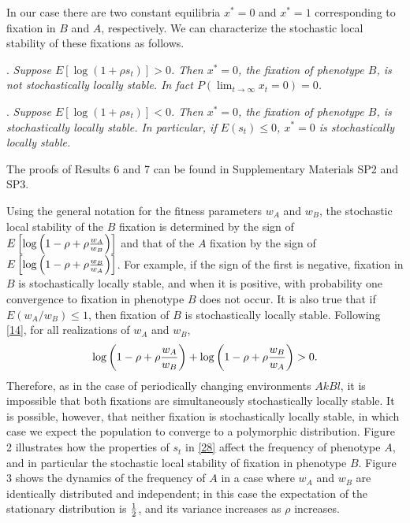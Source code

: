 \documentclass[9pt,twocolumn,twoside,lineno]{pnas-new}
\begin{document}
 In our case there are two constant equilibria $x^*=0$ and $x^*=1$ corresponding to fixation in $B$ and $A$, respectively. We can characterize the stochastic local stability of these fixations as follows.
 \medskip
 
 . {\sl Suppose $E\left[\log (1+\rho s_t)\right]>0$. Then $x^*=0$, the fixation of phenotype $B$, is not stochastically locally stable. In fact $P\left(\lim_{t\to\infty}x_t=0\right)=0$.}
 \medskip
 
  . {\sl Suppose $E[\log(1+\rho s_t)]<0$. Then $x^*=0$, the fixation of phenotype $B$, is stochastically locally stable. In particular, if $E(s_t)\le 0$, $x^*=0$ is stochastically locally stable.}
\smallskip
 
 The proofs of Results 6 and  7 can be found in Supplementary Materials SP2 and SP3.
 
 
 Using the general notation for the fitness parameters $w_A$ and $w_B$, the stochastic local stability of the $B$ fixation is determined by the sign of $E\left[\log\left(1-\rho+\rho{w_A\over w_B}\right)\right]$ and that of the $A$ fixation by the sign of $E\left[\log\left(1-\rho+\rho{w_B\over w_A}\right)\right]$. For example, if the  sign of the first  is negative, fixation in $B$ is stochastically locally stable, and when it is positive, with probability one convergence to fixation in phenotype $B$ does not occur. It is also true  that if $E(w_A/w_B)\le 1$, then fixation of $B$ is stochastically locally stable. Following \eqref{14}, for all realizations of $w_A$ and $w_B$,
 \begin{equation}
 \log\left(1-\rho +\rho{w_A\over w_B}\right) +\log\left(1-\rho +\rho{w_B\over w_A}\right)>0.\label{30}\end{equation}
 Therefore, as in the case of periodically changing environments $AkBl$, it is impossible that both fixations are simultaneously stochastically locally stable.  It is possible, however, that neither fixation is  stochastically locally stable, in which case we expect the population to converge to a polymorphic distribution. Figure 2 illustrates how the properties of $s_t$ in \eqref{28} affect the frequency of phenotype $A$, and in particular the stochastic local stability of fixation in phenotype $B$. Figure 3 shows the dynamics of the frequency of $A$ in a case where $w_A$ and $w_B$ are identically distributed and independent; in this case the expectation of the stationary distribution is ${1\over 2}$, and its variance increases as $\rho$ increases.
\end{document}
